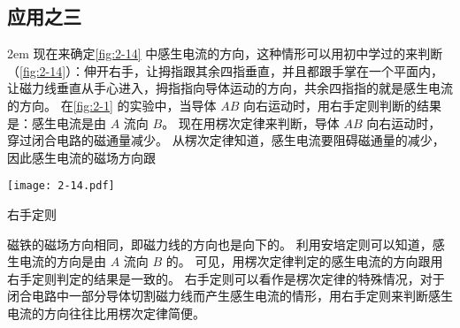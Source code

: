 \subsection*{应用之三} 

\medskip\noindent
\begin{minipage}{0.7\linewidth}\parindent2em
现在来确定\cref{fig:2-14} 中感生电流的方向，这种情形可以用初中学过的来判断（\cref{fig:2-14}）：伸开右手，让拇指跟其余四指垂直，并且都跟手掌在一个平面内，让磁力线垂直从手心进入，拇指指向导体运动的方向，共余四指指的就是感生电流的方向。
在\cref{fig:2-1} 的实验中，当导体 $AB$ 向右运动时，用右手定则判断的结果是：感生电流是由 $A$ 流向 $B$。
现在用楞次定律来判断，导体 $AB$ 向右运动时，穿过闭合电路的磁通量减少。
从楞次定律知道，感生电流要阻碍磁通量的减少，因此感生电流的磁场方向跟
\end{minipage}\hfill
\begin{minipage}{0.25\linewidth}\centering
  \begin{figurehere}
    \texttt{[image: 2-14.pdf]}
    \caption{右手定则}\label{fig:2-14}
  \end{figurehere}
\end{minipage}\par\medskip\noindent
磁铁的磁场方向相同，即磁力线的方向也是向下的。
利用安培定则可以知道，感生电流的方向是由 $A$ 流向 $B$ 的。
可见，用楞次定律判定的感生电流的方向跟用右手定则判定的结果是一致的。
右手定则可以看作是楞次定律的特殊情况，对于闭合电路中一部分导体切割磁力线而产生感生电流的情形，用右手定则来判断感生电流的方向往往比用楞次定律简便。


